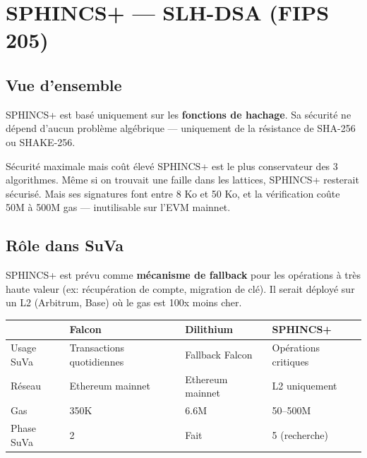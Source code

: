 \documentclass[12pt, a4paper]{article}
\begin{document}
\section{SPHINCS+ --- SLH-DSA (FIPS 205)}

\subsection{Vue d'ensemble}

SPHINCS+ est basé uniquement sur les \textbf{fonctions de hachage}. Sa sécurité ne dépend
d'aucun problème algébrique --- uniquement de la résistance de SHA-256 ou SHAKE-256.

\begin{definition}{Sécurité maximale mais coût élevé}
SPHINCS+ est le plus conservateur des 3 algorithmes. Même si on trouvait une faille
dans les lattices, SPHINCS+ resterait sécurisé. Mais ses signatures font entre
8 Ko et 50 Ko, et la vérification coûte 50M à 500M gas --- inutilisable sur l'EVM mainnet.
\end{definition}

\subsection{Rôle dans SuVa}

SPHINCS+ est prévu comme \textbf{mécanisme de fallback} pour les opérations à très haute
valeur (ex: récupération de compte, migration de clé). Il serait déployé sur un L2
(Arbitrum, Base) où le gas est 100x moins cher.

\begin{center}
\renewcommand{\arraystretch}{1.4}
\begin{tabular}{llll}
  \toprule
  & \textbf{Falcon} & \textbf{Dilithium} & \textbf{SPHINCS+} \\
  \midrule
  Usage SuVa & Transactions quotidiennes & Fallback Falcon & Opérations critiques \\
  Réseau & Ethereum mainnet & Ethereum mainnet & L2 uniquement \\
  Gas & 350K & 6.6M & 50--500M \\
  Phase SuVa & 2 & Fait & 5 (recherche) \\
  \bottomrule
\end{tabular}
\end{center}

\end{document}
